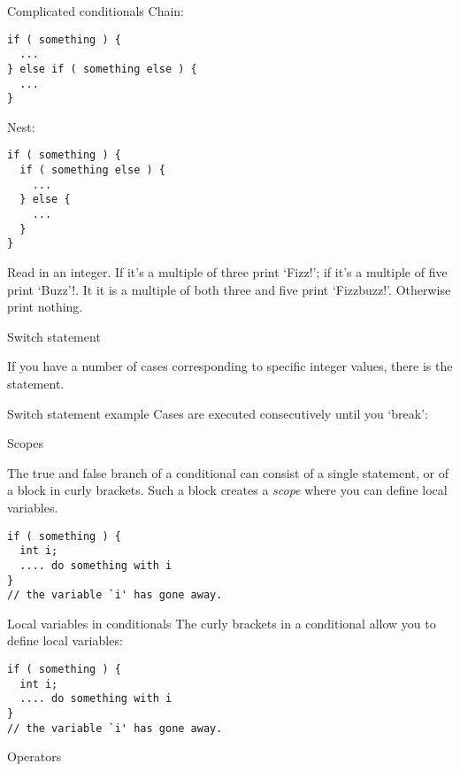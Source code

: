 \begin{slide}{Complicated conditionals}
  \label{sl:elseif}
  Chain:
\begin{verbatim}
if ( something ) {
  ...
} else if ( something else ) {
  ...
}
\end{verbatim}
Nest:
\begin{verbatim}
if ( something ) {
  if ( something else ) {
    ...
  } else {
    ...
  }
}
\end{verbatim}
\end{slide}

\begin{exercise}
  \label{ex:fizzbuzz}
  Read in an integer. If it's a multiple of three print `Fizz!';
  if it's a multiple of five print `Buzz'!. It it is 
  a multiple of both three and five print `Fizzbuzz!'. Otherwise
  print nothing.
\end{exercise}

 {Switch statement}

If you have a number of cases corresponding to specific integer
values, there is the  statement.

\begin{block}{Switch statement example}
  \label{sl:switch}
  Cases are executed consecutively until you `break':
\end{block}

 {Scopes}

The true and false branch of a conditional can consist of a single
statement, or of a block in curly brackets. Such a block creates a
%
\emph{scope}
%
where you can define local variables.

\begin{verbatim}
if ( something ) {
  int i; 
  .... do something with i
}
// the variable `i' has gone away.
\end{verbatim}

\begin{slide}{Local variables in conditionals}
  \label{sl:if-scope}
  The curly brackets in a conditional allow you to define local variables:
\begin{verbatim}
if ( something ) {
  int i; 
  .... do something with i
}
// the variable `i' has gone away.
\end{verbatim}
\end{slide}

 {Operators}

